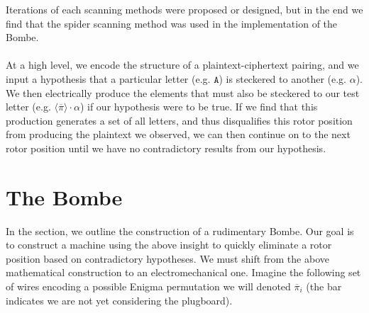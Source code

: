 Iterations of each scanning methods were proposed or designed, but in
the end we find that the spider scanning method was used in the
implementation of the Bombe. 
\\\\At a high level, we encode the structure
of a plaintext-ciphertext pairing, and we input a hypothesis that a particular
letter (e.g. $\texttt{A}$) is steckered to another (e.g. $\alpha$). We then
electrically produce the elements that must also be steckered to our test letter
(e.g. $\langle\overline{\pi}\rangle\cdot\alpha$) if our hypothesis
were to be true. If we find that this production generates a set of
all letters, and thus disqualifies this rotor position from producing
the plaintext we observed, we can then continue on to the next rotor
position until we have no contradictory results from our hypothesis.

\section{The Bombe}

In the section, we outline the construction of a rudimentary Bombe.
Our goal is to construct a machine using the above insight to quickly
eliminate a rotor position based on contradictory hypotheses. We must
shift from the above mathematical construction to an
electromechanical one. %
Imagine the following set of wires encoding a possible Enigma
permutation we will denoted $\overline\pi_i$ (the bar
indicates we are not yet considering the plugboard).


